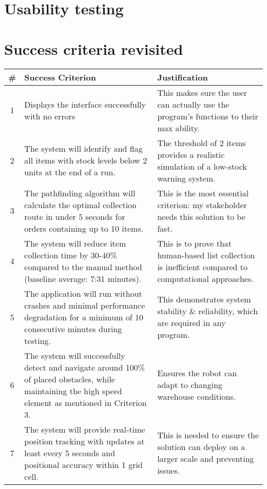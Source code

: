 \newpage

\section{Usability testing}


\newpage

\section{Success criteria revisited}

\begin{table}[htbp!]
	\centering
	\begin{tabularx}{\textwidth}{|c|X|X|}
		\hline
		\textbf{\#} & \textbf{Success Criterion} & \textbf{Justification} \\
		\hline
		1 & Displays the interface successfully with no errors & This makes sure the user can actually use the program's functions to their max ability. \\
		\hline
		2 & The system will identify and flag all items with stock levels below 2 units at the end of a run. & The threshold of 2 items provides a realistic simulation of a low-stock warning system. \\
		\hline
		3 & The pathfinding algorithm will calculate the optimal collection route in under 5 seconds for orders containing up to 10 items. & This is the most essential criterion: my stakeholder needs this solution to be fast. \\
		\hline
		4 & The system will reduce item collection time by 30-40\% compared to the manual method (baseline average: 7:31 minutes). & This is to prove that human-based list collection is inefficient compared to computational approaches. \\
		\hline
		5 & The application will run without crashes and minimal performance degradation for a minimum of 10 consecutive minutes during testing. & This demonstrates system stability \& reliability, which are required in any program. \\
		\hline
		6 & The system will successfully detect and navigate around 100\% of placed obstacles, while maintaining the high speed element as mentioned in Criterion 3. & Ensures the robot can adapt to changing warehouse conditions. \\
		\hline
		7 & The system will provide real-time position tracking with updates at least every 5 seconds and positional accuracy within 1 grid cell. & This is needed to ensure the solution can deploy on a larger scale and preventing issues. \\

\end{tabularx}
\end{table}
